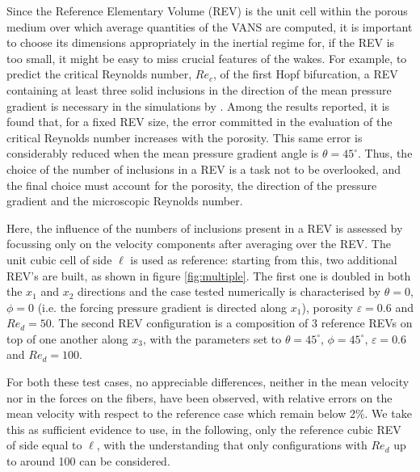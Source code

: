 Since the Reference Elementary Volume (REV) is the unit cell within the porous medium over which average quantities of the VANS are computed, 
it is important to choose its dimensions appropriately in the inertial regime for, if the REV is too small, it might be easy to miss crucial 
features of the wakes. For example, to predict the  critical Reynolds number, $Re_c$, of the first Hopf bifurcation, a REV containing at least 
three solid inclusions in the direction of the mean pressure gradient is necessary in the simulations by \citet{lasseux_hopf}. Among the 
results 
reported, it is found that, for a fixed REV size, the error committed in the evaluation of the critical Reynolds number increases with the 
porosity. This same error is considerably reduced when the mean pressure gradient angle is $\theta=45^\circ$. Thus, the choice of the number of 
inclusions in a REV is a task not to be overlooked, and the final choice must account for the porosity, the direction of the pressure gradient 
and the microscopic Reynolds number.

Here, the influence of the numbers of inclusions present in a REV is assessed by focussing only on the velocity components after averaging over the REV. The unit cubic cell of side $\ell$ is used as reference: starting from this, two additional REV's are built, as shown in figure \ref{fig:multiple}. The first one is doubled in both the $x_1$ and $x_2$ directions and the case tested numerically is characterised by $\theta=0$, $\phi=0$ (i.e. the forcing pressure gradient is directed along $x_1$), porosity $\varepsilon=0.6$ and $Re_d=50$. 
The second REV configuration is a composition of 3 reference REVs on top of one another along $x_3$, with the parameters set to $\theta=45^\circ$, $\phi=45^\circ$,  $\varepsilon=0.6$ and $Re_d=100$.

For both these test cases, no appreciable differences, neither in the mean velocity nor in the forces on the fibers, have been observed, with relative errors on the mean velocity with respect to the reference case which remain below  2\%.  We take this as sufficient evidence to use, in the following, only the reference cubic REV of side equal to $\ell$, with the understanding that only configurations with $Re_d$ up to around 100 can be considered.

